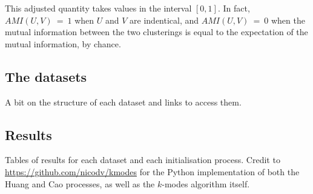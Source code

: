 \begin{remark}
    This adjusted quantity takes values in the interval \(\left[0, 1\right]\).
    In fact, \(AMI(U, V)~=~1\) when \(U\) and \(V\) are indentical, and
    \(AMI(U, V)~=~0\) when the mutual information between the two clusterings is
    equal to the expectation of the mutual information, by chance.\\
\end{remark}

\begin{definition}\label{def:homogeneity}
\end{definition}

\begin{definition}\label{def:completeness}
\end{definition}

\subsection{The datasets}\label{subsec:datasets}

A bit on the structure of each dataset and links to access them.


\subsection{Results}\label{subsec:results}

Tables of results for each dataset and each initialisation process. Credit to 
\url{https://github.com/nicodv/kmodes} for the Python implementation of both the
Huang and Cao processes, as well as the $k$-modes algorithm itself.

\begin{table}[H]
\resizebox{\textwidth}{!}{%
\centering
    
}
\end{table}
